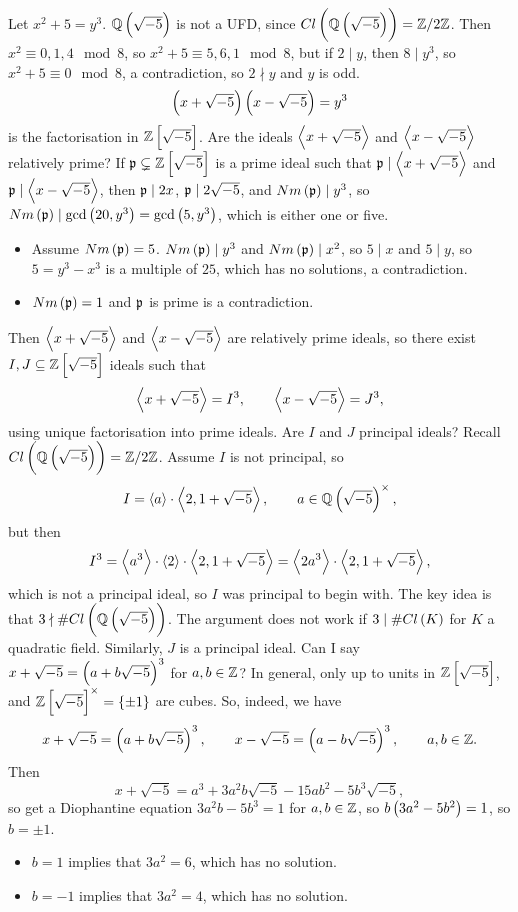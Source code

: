 \begin{example*}
Let $ x^2 + 5 = y^3 $. $ \Q\br{\sqrt{-5}} $ is not a UFD, since $ Cl\br{\Q\br{\sqrt{-5}}} = \Z / 2\Z $. Then $ x^2 \equiv 0, 1, 4 \mod 8 $, so $ x^2 + 5 \equiv 5, 6, 1 \mod 8 $, but if $ 2 \mid y $, then $ 8 \mid y^3 $, so $ x^2 + 5 \equiv 0 \mod 8 $, a contradiction, so $ 2 \nmid y $ and $ y $ is odd.
$$ \br{x + \sqrt{-5}}\br{x - \sqrt{-5}} = y^3 $$
is the factorisation in $ \Z\sbr{\sqrt{-5}} $. Are the ideals $ \left\langle x + \sqrt{-5} \right\rangle $ and $ \left\langle x - \sqrt{-5} \right\rangle $ relatively prime? If $ \pp \subsetneq \Z\sbr{\sqrt{-5}} $ is a prime ideal such that $ \mathfrak{p} \mid \left\langle x + \sqrt{-5} \right\rangle $ and $ \mathfrak{p} \mid \left\langle x - \sqrt{-5} \right\rangle $, then $ \mathfrak{p} \mid 2x $, $ \mathfrak{p} \mid 2\sqrt{-5} $, and $ Nm\br{\pp} \mid y^3 $, so $ Nm\br{\pp} \mid \gcd\br{20, y^3} = \gcd\br{5, y^3} $, which is either one or five.
\begin{itemize}
\item Assume $ Nm\br{\pp} = 5 $. $ Nm\br{\pp} \mid y^3 $ and $ Nm\br{\pp} \mid x^2 $, so $ 5 \mid x $ and $ 5 \mid y $, so $ 5 = y^3 - x^3 $ is a multiple of $ 25 $, which has no solutions, a contradiction.
\item $ Nm\br{\pp} = 1 $ and $ \mathfrak{p} $ is prime is a contradiction.
\end{itemize}
Then $ \left\langle x + \sqrt{-5} \right\rangle $ and $ \left\langle x - \sqrt{-5} \right\rangle $ are relatively prime ideals, so there exist $ I, J \subseteq \Z\sbr{\sqrt{-5}} $ ideals such that
$$ \left\langle x + \sqrt{-5} \right\rangle = I^3, \qquad \left\langle x - \sqrt{-5} \right\rangle = J^3, $$
using unique factorisation into prime ideals. Are $ I $ and $ J $ principal ideals? Recall $ Cl\br{\Q\br{\sqrt{-5}}} = \Z / 2\Z $. Assume $ I $ is not principal, so
$$ I = \abr{a} \cdot \abr{2, 1 + \sqrt{-5}}, \qquad a \in \Q\br{\sqrt{-5}}^\times, $$
but then
$$ I^3 = \left\langle a^3 \right\rangle \cdot \left\langle 2 \right\rangle \cdot \left\langle 2, 1 + \sqrt{-5} \right\rangle = \left\langle 2a^3 \right\rangle \cdot \left\langle 2, 1 + \sqrt{-5} \right\rangle, $$
which is not a principal ideal, so $ I $ was principal to begin with. The key idea is that $ 3 \nmid \#Cl\br{\Q\br{\sqrt{-5}}} $. The argument does not work if $ 3 \mid \#Cl\br{K} $ for $ K $ a quadratic field. Similarly, $ J $ is a principal ideal. Can I say $ x + \sqrt{-5} = \br{a + b\sqrt{-5}}^3 $ for $ a, b \in \mathbb{Z} $? In general, only up to units in $ \Z\sbr{\sqrt{-5}} $, and $ \Z\sbr{\sqrt{-5}}^\times = \cbr{\pm 1} $ are cubes. So, indeed, we have
$$ x + \sqrt{-5} = \br{a + b\sqrt{-5}}^3, \qquad x - \sqrt{-5} = \br{a - b\sqrt{-5}}^3, \qquad a, b \in \Z. $$
Then
$$ x + \sqrt{-5} = a^3 + 3a^2b\sqrt{-5} - 15ab^2 - 5b^3\sqrt{-5}, $$
so get a Diophantine equation $ 3a^2b - 5b^3 = 1 $ for $ a, b \in \mathbb{Z} $, so $ b\br{3a^2 - 5b^2} = 1 $, so $ b = \pm 1 $.
\begin{itemize}
\item $ b = 1 $ implies that $ 3a^2 = 6 $, which has no solution.
\item $ b = -1 $ implies that $ 3a^2 = 4 $, which has no solution.
\end{itemize}
\end{example*}


